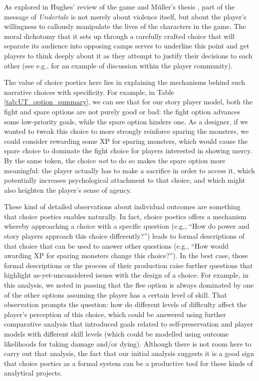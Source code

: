 \documentclass[arts,article,submit,moreauthors,pdftex,10pt,a4paper]{Definitions/mdpi}
\begin{document}
As explored in Hughes' review of the game and Müller's thesis \citep{hughes2015undertale,muller2017undertale}, part of the message of \emph{Undertale} is not merely about violence itself, but about the player's willingness to callously manipulate the lives of the characters in the game.
%
The moral dichotomy that it sets up through a carefully crafted choice that will separate its audience into opposing camps serves to underline this point and get players to think deeply about it as they attempt to justify their decisions to each other (see e.g., \cite{oh2016genocide} for an example of discussion within the player community).


The value of choice poetics here lies in explaining the mechanisms behind such narrative choices with specificity.
%
For example, in Table \ref{tab:UT_option_summary}, we can see that for our story player model, both the fight and spare options are not purely good or bad: the fight option advances some low-priority goals, while the spare option hinders one.
%
As a designer, if we wanted to tweak this choice to more strongly reinforce sparing the monsters, we could consider rewarding some XP for sparing monsters, which would cause the spare choice to dominate the fight choice for players interested in showing mercy.
%
By the same token, the choice \emph{not} to do so makes the spare option more meaningful: the player actually has to make a sacrifice in order to access it, which potentially increases psychological attachment to that choice, and which might also heighten the player's sense of agency.


These kind of detailed observations about individual outcomes are something that choice poetics enables naturally.
%
In fact, choice poetics offers a mechanism whereby approaching a choice with a specific question (e.g., ``How do power and story players approach this choice differently?'') leads to formal descriptions of that choice that can be used to answer other questions (e.g., ``How would awarding XP for sparing monsters change this choice?'').
%
In the best case, those formal descriptions or the process of their production raise further questions that highlight as-yet-unconsidered issues with the design of a choice.
%
For example, in this analysis, we noted in passing that the flee option is always dominated by one of the other options assuming the player has a certain level of skill.
%
That observation prompts the question: how do different levels of difficulty affect the player's perception of this choice, which could be answered using further comparative analysis that introduced goals related to self-preservation and player models with different skill levels (which could be modelled using outcome likelihoods for taking damage and/or dying).
%
Although there is not room here to carry out that analysis, the fact that our initial analysis suggests it is a good sign that choice poetics as a formal system can be a productive tool for these kinds of analytical projects.
\end{document}
